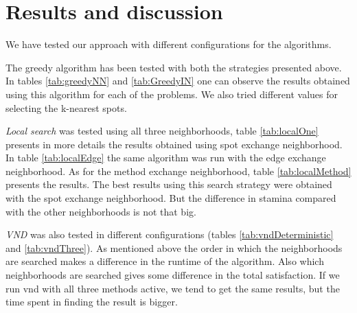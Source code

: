 \documentclass{article}
\begin{document}



\section{Results and discussion}

We have tested our approach with different configurations for the algorithms. 

The greedy algorithm has been tested with both the strategies presented above. In tables \ref{tab:greedyNN} and \ref{tab:GreedyIN} one can observe the results obtained using this algorithm for each of the problems. We also tried different values for selecting the k-nearest spots. 
\medskip

\emph{Local search} was tested using all three neighborhoods, table \ref{tab:localOne} presents in more details the results obtained using spot exchange neighborhood. In table \ref{tab:localEdge} the same algorithm was run with the edge exchange neighborhood. As for the method exchange neighborhood, table \ref{tab:localMethod} presents the results. The best results using this search strategy were obtained with the spot exchange neighborhood. But the difference in stamina compared with the other neighborhoods is not that big. 
\medskip

\emph{VND} was also tested in different configurations (tables \ref{tab:vndDeterministic} and \ref{tab:vndThree}). As mentioned above the order in which the neighborhoods are searched makes a difference in the runtime of the algorithm. Also which neighborhoods are searched gives some difference in the total satisfaction. If we run vnd with all three methods active, we tend to get the same results, but the time spent in finding the result is bigger.  
\medskip
\end{document}
